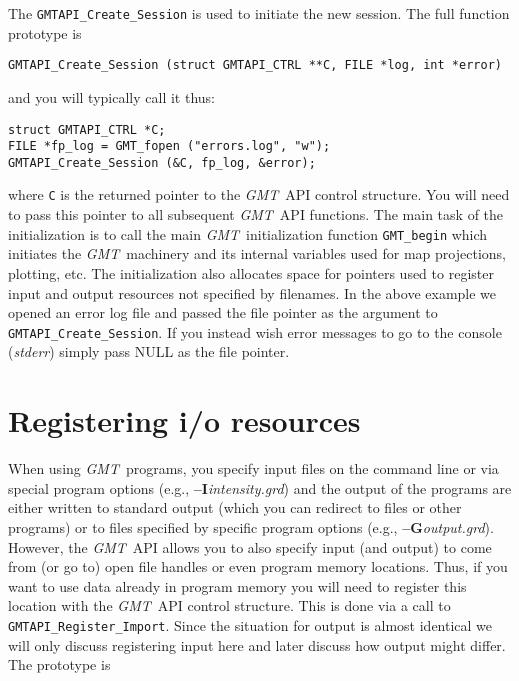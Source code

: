 \documentclass{report}
\newcommand{\GMT}{\textit{GMT}}%
\newcommand{\GMT}{\htmladdnormallink{\texttt{[image: eps/GMT\_glyph10.eps]}}{http://gmt.soest.hawaii.edu}}%
\newcommand{\Opt}[1]{{\bf --#1}}%
\newcommand{\GMT}{\htmladdnormallink{\textbf{GMT}}{http://gmt.soest.hawaii.edu}}%
\newcommand{\Opt}[1]{{\bf -#1}}%
\begin{document}
The \texttt{GMTAPI\_Create\_Session} is used to initiate the new session.  The full
function prototype is

\begin{verbatim}
GMTAPI_Create_Session (struct GMTAPI_CTRL **C, FILE *log, int *error)
\end{verbatim}
and you will typically call it thus:
\begin{verbatim}
struct GMTAPI_CTRL *C;
FILE *fp_log = GMT_fopen ("errors.log", "w");
GMTAPI_Create_Session (&C, fp_log, &error);
\end{verbatim}
where \texttt{C} is the returned pointer to the \GMT\ API control structure.  You will need to
pass this pointer to all subsequent \GMT\ API functions.  The main task of the initialization
is to call the main \GMT\ initialization function \texttt{GMT\_begin} which initiates the \GMT\
machinery and its internal variables used for map projections, plotting, etc.  The initialization
also allocates space for pointers used to register input and output resources not specified by filenames.
In the above example we opened an error log file and passed the file pointer as the argument to
\texttt{GMTAPI\_Create\_Session}.  If you instead wish error messages to go to the console
(\emph{stderr}) simply pass NULL as the file pointer.

\section{Registering i/o resources}
\index{GMT@\GMT!Registering i/o resources}
When using \GMT\ programs, you specify input files on
the command line or via special program options (e.g., \Opt{I}{\it intensity.grd}) and the output of
the programs are either written to standard output (which you can redirect to files or other programs)
or to files specified by specific program options (e.g., \Opt{G}{\it output.grd}).  However, the
\GMT\ API allows you to also specify input (and output) to come from (or go to) open file handles
or even program memory locations.  Thus, if you want to use data already in program memory you will
need to register this location with the \GMT\ API control structure.  This is done via a call to
\texttt{GMTAPI\_Register\_Import}.  Since the situation for output is almost identical we will only
discuss registering input here and later discuss how output might differ.  The prototype is
\end{document}

